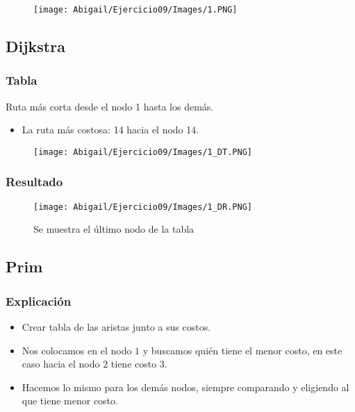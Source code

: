 \documentclass[12pt]{article}
\begin{document}
    \begin{figure}[h!]
      \centering
      \texttt{[image: Abigail/Ejercicio09/Images/1.PNG]}
    \end{figure} 

    \subsection{Dijkstra}

      \subsubsection{Tabla}
        Ruta más corta desde el nodo 1 hasta los demás.

        \begin{itemize}
          \item La ruta más costosa: 14 hacia el nodo 14.
        \end{itemize}

        \begin{figure}[h!]
          \centering
          \texttt{[image: Abigail/Ejercicio09/Images/1\_DT.PNG]}
        \end{figure} 

      \subsubsection{Resultado}
        \begin{figure}[h!]
          \centering
          \texttt{[image: Abigail/Ejercicio09/Images/1\_DR.PNG]}
          \caption{Se muestra el último nodo de la tabla}
        \end{figure} 


    \subsection{Prim}

      \subsubsection{Explicación}
        \begin{itemize}

          \item[\Checkmark] Crear tabla de las aristas junto a sus costos.

          \item[\Checkmark] Nos colocamos en el nodo $1$ y buscamos quién tiene el menor costo, en este caso hacia el nodo $2$ tiene costo $3$.

          \item[\Checkmark] Hacemos lo mismo para los demás nodos, siempre comparando y eligiendo al que tiene menor costo.

        \end{itemize}
\end{document}
